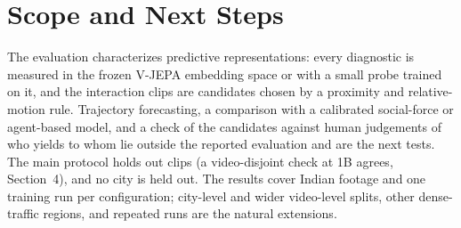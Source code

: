 \section{Scope and Next Steps}
\label{sec:scope}

The evaluation characterizes predictive representations: every diagnostic is measured in the frozen V-JEPA embedding space or with a small probe trained on it, and the interaction clips are candidates chosen by a proximity and relative-motion rule. Trajectory forecasting, a comparison with a calibrated social-force or agent-based model, and a check of the candidates against human judgements of who yields to whom lie outside the reported evaluation and are the next tests. The main protocol holds out clips (a video-disjoint check at 1B agrees, Section~4), and no city is held out. The results cover Indian footage and one training run per configuration; city-level and wider video-level splits, other dense-traffic regions, and repeated runs are the natural extensions.
